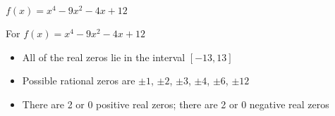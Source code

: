 {$f(x) = x^{4} - 9x^{2} - 4x + 12$}
{ For  $f(x) = x^{4} - 9x^{2} - 4x + 12$
\begin{itemize}
\item  All of the real zeros lie in the interval $[-13,13]$
\item  Possible rational zeros are $\pm 1$, $\pm 2$, $\pm 3$, $\pm 4$, $\pm 6$, $\pm 12$
\item  There are 2 or 0 positive real zeros;  there are 2 or 0 negative real zeros
\end{itemize}
}